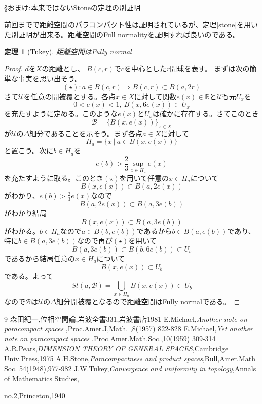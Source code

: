 \documentclass[leqno]{jsarticle}
\newtheorem{thm}{定理}
\newcommand{\To}{\Longrightarrow}
\newcommand{\rr}{\mathbb{R}}
\newcommand{\dpst}{\displaystyle}
\begin{document}
\S おまけ:本来ではないStoneの定理の別証明\par
前回までで距離空間のパラコンパクト性は証明されているが、定理\ref{stone}を用いた別証明が出来る。距離空間のFull normalityを証明すれば良いのである。
\begin{thm}[Tukey]
距離空間はFully normal
\end{thm}
\begin{proof}$d$を$X$の距離とし、
$B(c,r)$で$c$を中心とした$r$開球を表す。
まずは次の簡単な事実を思い出そう。
\[
(\star):a\in B(c,r)\To B(c,r)\subset B(a,2r)
\]
さて$\mathcal{U}$を任意の開被覆とする。各点$x\in X$に対して関数$e(x)\in \rr$と$\mathcal{U}$も元$U_x$を
\[
0<e(x)<1,\ B(x,6e(x))\subset U_x
\]
を充たすように定める。このような$e(x)$と$U_x$は確かに存在する。さてこのとき
\[
\mathcal{B}=\{B(x,e(x))\}_{x\in X}
\]
が$\mathcal{U}$の$\Delta$細分であることを示そう。まず各点$a\in X$に対して
\[
H_a=\{x\ |\ a\in B(x,e(x))\}
\]
と置こう。次に$b\in H_a$を
\[
e(b)>\frac{2}{3}\sup_{x\in H_a}e(x)
\]
を充たすように取る。このとき$(\star)$を用いて任意の$x\in H_a$について
\[
B(x,e(x))\subset B(a,2e(x))
\]
がわかり、$\dpst e(b)>\frac{2}{3}e(x)$なので
\[
B(a,2e(x))\subset B(a,3e(b))
\]
がわかり結局
\[
B(x,e(x))\subset B(a,3e(b))
\]
がわかる。$b\in H_a$なので$a\in B(b,e(b))$であるから$b\in B(a,e(b))$であり、特に$b\in B(a,3e(b))$なので再び$(\star)$を用いて
\[
B(a,3e(b))\subset B(b,6e(b))\subset U_b
\]
であるから結局任意の$x\in H_a$について
\[
B(x,e(x))\subset U_b
\]
である。よって
\[
St(a,\mathcal{B})=\bigcup_{x\in H_a}B(x,e(x))\subset U_b
\]
なので$\mathcal{B}$は$\mathcal{U}$の$\Delta$細分開被覆となるので距離空間はFully normalである。

\end{proof}












	
\begin{thebibliography}{9}
森田紀一,位相空間論,岩波全書331,岩波書店1981
E.Michael,{\it Another note on paracompact spaces },Proc.Amer.J,Math. ,8(1957) 822-828
E.Michael,{\it Yet another note on paracompact spaces },Proc.Amer.Math.Soc.,10(1959) 309-314
A.R.Pears,{\it DIMENSION THEORY OF GENERAL SPACES},Cambridge Univ.Press,1975
A.H.Stone,{\it Paracompactness and product spaces},Bull,Amer.Math Soc. 54(1948),977-982
J.W.Tukey,{\it Convergence and uniformity in topology},Annals of Mathematics Studies, \par no.2,Princeton,1940
\end{thebibliography}




			
\end{document}

